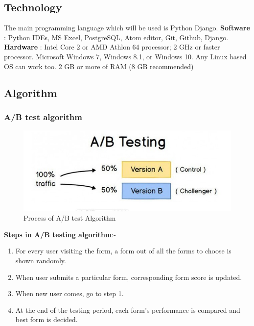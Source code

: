 \documentclass[12pt]{report}
\begin{document}
\subsection{Technology}
The main programming language which will be used is Python Django.
\newline
\newline
\textbf{Software} : Python IDEs, MS Excel, PostgreSQL, Atom editor, Git, Github, Django.
\newline
\newline
\textbf{Hardware} : Intel Core 2 or AMD Athlon 64 processor; 2 GHz or faster processor. Microsoft Windows 7, Windows 8.1, or Windows 10. Any Linux based OS can work too. 2 GB or more of RAM (8 GB recommended)
\subsection{Algorithm}
\subsubsection{A/B test algorithm}
\begin{figure}[H]
\includegraphics[scale=0.7]{abtest.jpg}
\caption{Process of A/B test Algorithm}
\end{figure}
\textbf {Steps in A/B testing algorithm}:-
\newline
\begin{enumerate}
\item For every user visiting the form, a form out of all the forms to choose is shown randomly.
\item When user submits a particular form, corresponding form score is updated.
\item When new user comes, go to step 1.
\item At the end of the testing period, each form's performance is compared and best form is decided. 
\end{enumerate}
\end{document}
